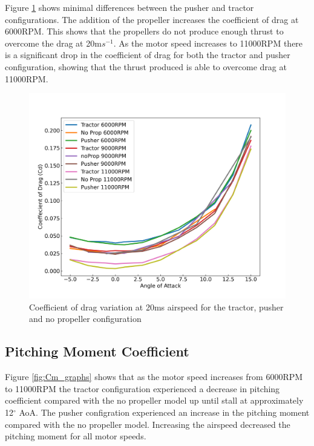 Figure \ref{fig:Cd_20ms} shows minimal differences between the pusher and tractor configurations. The addition of the propeller increases the coefficient of drag at 6000RPM. This shows that the propellers do not produce enough thrust to overcome the drag at 20m$s^{-1}$. As the motor speed increases to 11000RPM there is a significant drop in the coefficient of drag for both the tractor and pusher configuration, showing that the thrust produced is able to overcome drag at 11000RPM. 
\begin{figure}[H]
    \centering
    \includegraphics[scale = 0.7]{05_Results/Figs/Cd/20ms_Cd.png}
    \caption{Coefficient of drag variation at 20ms airspeed for the tractor, pusher and no propeller configuration}
    \label{fig:Cd_20ms}
\end{figure}

\subsection{Pitching Moment Coefficient}

Figure \ref{fig:Cm_graphs} shows that as the motor speed increases from 6000RPM to 11000RPM the tractor configuration experienced a decrease in pitching coefficient compared with the no propeller model up until stall at approximately 12$^\circ$ AoA. The pusher configration experienced an increase in the pitching moment compared with the no propeller model. Increasing the airspeed decreased the pitching moment for all motor speeds.

